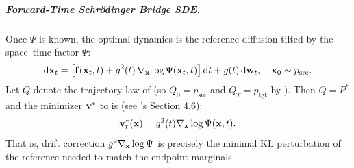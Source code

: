 \subparagraph{Forward-Time Schrödinger Bridge SDE.}
Once $\Psi$ is known, the optimal dynamics is the reference diffusion tilted by
the space–time factor $\Psi$:
\begin{align}\label{eq:sb-forward-sde}
    \mathop{}\!\mathrm{d} {\mathbf{x}}_t = \bigl[{\mathbf{f}}({\mathbf{x}}_t, t) + g^2(t)\,\nabla_{\mathbf{x}} \log \Psi({\mathbf{x}}_t, t)\bigr]\mathop{}\!\mathrm{d} t
+ g(t)\mathop{}\!\mathrm{d} {\mathbf{w}}_t, \quad {\mathbf{x}}_0 \sim p_{\mathrm{src}}.
\end{align}
Let $Q$ denote the trajectory law of 
(so $Q_0=p_{\mathrm{src}}$ and $Q_T=p_{\mathrm{tgt}}$ by
). Then
\emph{$Q=P^*$} and the minimizer ${\mathbf{v}}^*$ to  is (see \citep{chen2021stochastic}'s Section 4.6): 
\[
{\mathbf{v}}_t^{*}({\mathbf{x}}) = g^2(t) \nabla_{\mathbf{x}} \log \Psi({\mathbf{x}},t).
\]
That is,
drift correction $g^2\nabla_{\mathbf{x}}\log\Psi$ is precisely the
minimal KL perturbation of the reference needed to match the endpoint
marginals. 


